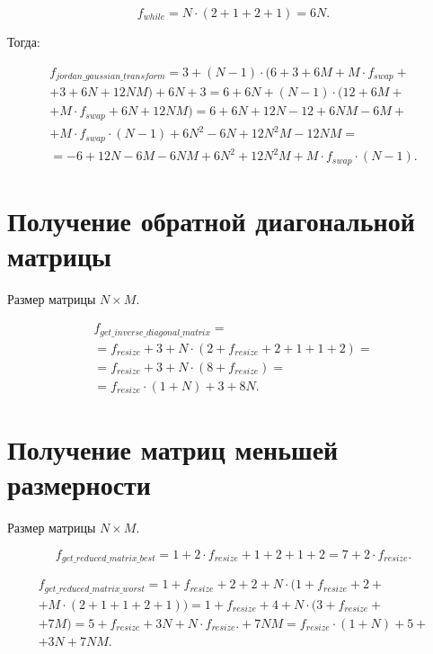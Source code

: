 \begin{equation}
	f_{while} = N \cdot (2 + 1 + 2 + 1) = 6N.
\end{equation}

Тогда:

\begin{equation}
	\begin{gathered}
		f_{jordan\_gaussian\_transform} = 3 + (N - 1) \cdot (6 + 3 + 6M + M \cdot f_{swap} +\\+ 3 + 6N+ 12NM)  + 6N + 3 = 6 + 6N + (N - 1) \cdot (12 + 6M +\\+ M \cdot f_{swap} + 6N + 12NM) = 6 + 6N + 12N - 12 + 6NM - 6M +\\+ M \cdot f_{swap} \cdot (N - 1) + 6N^2 - 6N + 12N^2M - 12NM =\\= -6 + 12N - 6M - 6NM + 6N^2 + 12N^2M + M \cdot f_{swap} \cdot (N - 1).
	\end{gathered}
\end{equation}

\section{Получение обратной диагональной матрицы}

Размер матрицы $N \times M$.

\begin{equation}
	\begin{gathered}
		f_{get\_inverse\_diagonal\_matrix} =\\= f_{resize} + 3 + N \cdot (2 + f_{resize} + 2 + 1 + 1 + 2) =\\= f_{resize} + 3 + N \cdot (8 + f_{resize}) =\\
		=f_{resize} \cdot (1 + N) + 3 + 8N.
	\end{gathered}
\end{equation}

\section{Получение матриц меньшей размерности}

Размер матрицы $N \times M$.

\begin{equation}
	f_{get\_reduced\_matrix\_best} = 1 + 2 \cdot f_{resize} + 1 + 2 + 1 + 2 = 7 + 2 \cdot f_{resize}.
\end{equation}

\begin{equation}
	\begin{gathered}
		f_{get\_reduced\_matrix\_worst} = 1 + f_{resize} + 2 + 2 + N \cdot (1 + f_{resize} + 2 +\\+ M \cdot (2 + 1 + 1 + 2 + 1)) = 1 + f_{resize} + 4 + N \cdot (3 + f_{resize} +\\+ 7M) =
		5 + f_{resize} + 3N + N \cdot f_{resize}. + 7NM = f_{resize} \cdot (1 + N) + 5 +\\+ 3N + 7NM.
	\end{gathered}
\end{equation}



